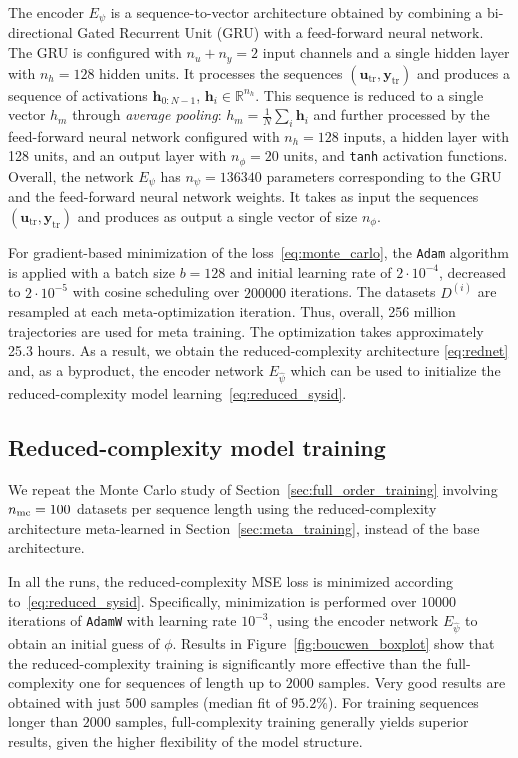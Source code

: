 \documentclass{article}
\newcommand{\base}{{base architecture}}
\newcommand{\tr}{\mathrm{tr}}
\newcommand{\seq}[1]{{\mathbf{#1}}}
\newcommand{\R}{\mathbb{R}}
\newcommand{\redpar}{\phi}
\newcommand{\encpar}{\psi}
\begin{document}
The encoder $E_\encpar$ is a sequence-to-vector architecture obtained by combining a bi-directional Gated Recurrent Unit (GRU) with a feed-forward neural network. The GRU is configured with $n_u+n_y=2$ input channels and a single hidden layer with $n_h=128$ hidden units.
It processes the sequences $(\seq u_\tr , \seq y_\tr )$ and produces a sequence of activations  $\seq h_{0:N-1}$, $\seq{h}_i \in \R^{n_h}$. This sequence is reduced to a single vector $h_m$ through \emph{average pooling}: $h_m = \frac{1}{N} \sum_i{\seq {h}_i}$ and further processed by the feed-forward neural network configured with
$n_h=128$ inputs, a hidden layer with 128 units, and an output layer with
$n_\redpar = 20$ units, and \texttt{tanh} activation functions. Overall, the network $E_\encpar$ has $n_\encpar=136340$ parameters corresponding to the GRU and the feed-forward neural network weights. It takes as input the sequences $(\seq u_\tr , \seq y_\tr )$ and produces as output a single vector of size $n_\redpar$.

For gradient-based minimization of the loss~\eqref{eq:monte_carlo}, the \texttt{Adam} algorithm is applied with a batch size $b=128$ and initial learning rate of $2 \cdot 10^{-4}$, decreased to $2 \cdot 10^{-5}$ with cosine scheduling over $200000$ iterations. The datasets $D^{(i)}$ are resampled at each meta-optimization iteration. Thus, overall, 256 million trajectories are used for meta training.
The optimization takes approximately 25.3 hours. As a result, we obtain the reduced-complexity architecture
\eqref{eq:rednet} and, as a byproduct, the encoder network $E_{\hat \encpar}$ which can be used to initialize the reduced-complexity model learning~\eqref{eq:reduced_sysid}.

\subsection{Reduced-complexity model training}
\label{sec:reduced_order_training}
We repeat the Monte Carlo study of Section~\ref{sec:full_order_training} involving $n_{\rm mc}=100$ datasets per sequence length using the reduced-complexity architecture meta-learned in Section~\ref{sec:meta_training}, instead of the \base.

In all the runs, the reduced-complexity MSE loss is minimized according to~\eqref{eq:reduced_sysid}. Specifically, minimization is performed over $10000$ iterations of \texttt{AdamW} with learning rate $10^{-3}$, using the encoder network $E_{\hat \encpar}$ to obtain an initial guess of $\redpar$. Results in Figure~\ref{fig:boucwen_boxplot} show that the reduced-complexity training is significantly more effective than the full-complexity one for sequences of length up to $2000$ samples. Very good results are obtained with just $500$ samples (median fit of $95.2\%$). For training sequences longer than $2000$ samples, full-complexity training generally yields superior results, given the higher flexibility of the model structure.
\end{document}
